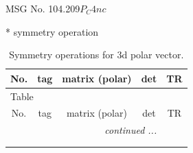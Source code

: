 \documentclass[fleqn,8pt]{jsarticle}
\begin{document}
\setcounter{MaxMatrixCols}{32}

\renewcommand{\tablename}{Table~}
\renewcommand{\figurename}{Figure~}
\begin{center}
\LARGE
MSG No. 104.209\quad$P_{C}4nc$
\end{center}
* symmetry operation
\renewcommand{\arraystretch}{1.3}
\begin{longtable}{ccccc}
\caption{Symmetry operations for 3d polar vector.}
 \\
 \hline \hline
No. & tag & matrix (polar) & det & TR \\ \hline \endfirsthead

\multicolumn{4}{l}{\tablename\ \thetable{}} \\
 \hline \hline
No. & tag & matrix (polar) & det & TR \\ \hline \endhead

 \hline \hline
\multicolumn{4}{r}{\footnotesize\it continued ...} \\ \endfoot

 \hline \hline
\multicolumn{4}{r}{} \\ \endlastfoot


\end{longtable}
\end{document}
